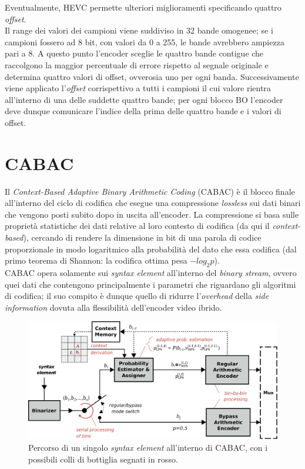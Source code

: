 Eventualmente, HEVC permette ulteriori miglioramenti specificando quattro 
\emph{offset}. \\
Il range dei valori dei campioni viene suddiviso in 32 bande omogenee; se i 
campioni fossero ad 8 bit, con valori da 0 a 255, le bande avrebbero ampiezza 
pari a 8. A questo punto l'encoder sceglie le quattro bande contigue che 
raccolgono la maggior percentuale di errore rispetto al segnale originale e 
determina quattro valori di offset, ovverosia uno per ogni banda. 
Successivamente viene applicato l'\emph{offset} corrispettivo a tutti i campioni
il cui valore rientra all'interno di una delle suddette quattro bande; per ogni 
blocco BO l'encoder deve dunque comunicare l'indice della prima delle quattro 
bande e i valori di offset.


\section{CABAC}
Il \emph{Context-Based Adaptive Binary Arithmetic Coding} (CABAC) è il blocco 
finale all'interno del ciclo di codifica che esegue una compressione 
\emph{lossless} sui dati binari che vengono posti subito dopo in uscita 
all'encoder. La compressione si basa sulle proprietà statistiche dei dati 
relative al loro contesto di codifica (da qui il \emph{context-based}), cercando
di rendere la dimensione in bit di una parola di codice proporzionale in modo 
logaritmico alla probabilità del dato che essa codifica (dal primo 
teorema di Shannon: la codifica ottima pesa $-log_2p$). \\
CABAC opera solamente sui \emph{syntax element} all'interno del \emph{binary 
stream}, ovvero quei dati che contengono principalmente i parametri che 
riguardano gli algoritmi di codifica; il suo compito è dunque quello di ridurre
l'\emph{overhead} della \emph{side information} dovuta alla flessibilità 
dell'encoder video ibrido. \\

\begin{figure}[H]
  \centering
  \captionsetup{justification=raggedright}
  \includegraphics[scale=0.35]{Figures/Cabac_overview}
  \caption[Percorso di un \emph{syntax element} dentro CABAC]
	  {Percorso di un singolo \emph{syntax element} all'interno di CABAC,
	   con i possibili colli di bottiglia segnati in rosso.}
\end{figure}

